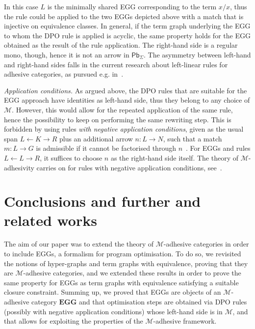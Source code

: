 \documentclass[3p]{elsarticle}
\newcommand{\pbc}{\mathsf{Pb}}
\newcommand{\eg}[0]{\mathbf{EGG}}
\theoremstyle{remark}
\theoremstyle{definition}
\begin{document}
In this case $L$ is the minimally shared EGG corresponding to the term $x / x$,
thus the rule could be applied to the two EGGs
depicted above with a match that is injective on equivalence classes.
%
In general, if the term graph underlying the EGG to whom the DPO rule is applied is acyclic,
the same property holds for the EGG obtained as the result of the rule application.
%
The right-hand side is a regular mono, though, hence it is not an arrow in $\pbc_\Sigma$.
The asymmetry between left-hand and right-hand sides falls in the current research about left-linear rules for 
adhesive categories, as pursued e.g. in~\cite{BaldanC0G24}.

\emph{Application conditions.} 
As argued above, the DPO rules that are suitable for the EGG approach have identities as left-hand side,
thus they belong to any choice of $\mathcal{M}$.
%
However, this would allow for the repeated application of the same rule, hence the 
possibility to keep on performing the same rewriting step.
This is forbidden by using rules \emph{with negative application conditions}, given as the usual span 
$L \leftarrow K \rightarrow R$ plus an additional arrow $n: L\rightarrow N$, such that a match $m: L \to G$ is admissible if it cannot
be factorised through $n$~\cite{HabelHT96}. For EGGs and rules $L \leftarrow L \rightarrow R$, it suffices to choose $n$ as the right-hand side itself.
%
The theory of $\mathcal{M}$-adhesivity carries on for rules with negative application conditions, see~\cite{ehrig2012,ehrig2014adhesive}.

\section{Conclusions and further and related works}
\label{conclusioni}
The aim of our paper was to extend the theory of $\mathcal{M}$-adhesive categories in order to include EGGs, 
a formalism for program optimisation. 
%
To do so, we revisited the notions of hyper-graphs and term graphs with equivalence, 
proving that they are $\mathcal{M}$-adhesive categories, and we extended these results in order to
prove the same property for EGGs as term graphs with equivalence satisfying a suitable closure constraint.
Summing up, we proved that EGGs are objects of an $\mathcal{M}$-adhesive category $\eg$ 
and that optimisation steps are obtained via DPO rules (possibly with negative application conditions) whose 
left-hand side is in $\mathcal{M}$,
and that allows for exploiting the properties 
of the $\mathcal{M}$-adhesive framework.
\end{document}
